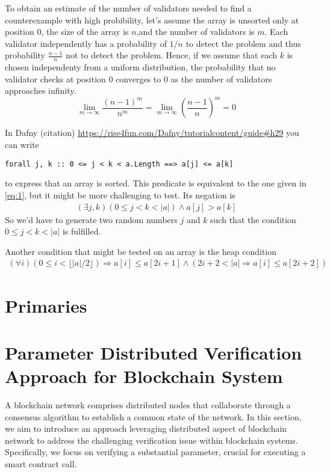 \documentclass[runningheads]{llncs}
\begin{document}
To obtain an estimate of the number of validators needed to find a counterexample with high probibility, let's assume the array is unsorted only at position $0$, the size of the array is $n$,and the number of validators is $m$. Each validator independently has a probability of $1/n$ to detect the problem and thus probability $\frac{n-1} n$ not to detect the problem. Hence, if we assume that each $k$ is chosen independenty from a uniform distribution, the probability that no validator checks at position $0$ converges to $0$ as the number of validators approaches infinity.
\begin{displaymath}
  \lim_{m\to\infty}\frac{(n-1)^m}{n^m}
  = \lim_{m\to\infty} \left(\frac{n-1}{n}\right)^m
  = 0
\end{displaymath}

In Dafny (citation) \url{https://rise4fun.com/Dafny/tutorialcontent/guide#h29} you can
write
\begin{lstlisting}
forall j, k :: 0 <= j < k < a.Length ==> a[j] <= a[k]
\end{lstlisting}
to express that an array is sorted. This predicate is equivalent to the one given in
\eqref{eq:1}, but it might be more challenging to test. Its negation is
\begin{gather}
  \label{eq:2}
  (\exists j, k ) (0\le j< k < |a|) \wedge a[j] > a[k]
\end{gather}
So we'd have to generate two random numbers $j$ and $k$ such that the condition $0 \le
j < k < |a|$ is fulfilled.


Another condition that might be tested on an array is the heap condition
\begin{gather}
  \label{eq:3}
  (\forall i) (0 \le i < \lfloor|a|/2\rfloor) \Rightarrow a[i] \le a[2i+1] \wedge (2i+2
  < |a| \Rightarrow a[i] \le a[2i+2])
\end{gather}

\section{Primaries}
\label{sec:primaries}

\section{Parameter Distributed Verification Approach for Blockchain System}
\label{sec:approach}
A blockchain network comprises distributed nodes that collaborate through a consensus algorithm to establish a common state of the network. In this section, we aim to introduce an approach leveraging distributed aspect of blockchain network to address the challenging verification issue within blockchain systems. Specifically, we focus on verifying a substantial parameter, crucial for executing a smart contract call.
\end{document}

